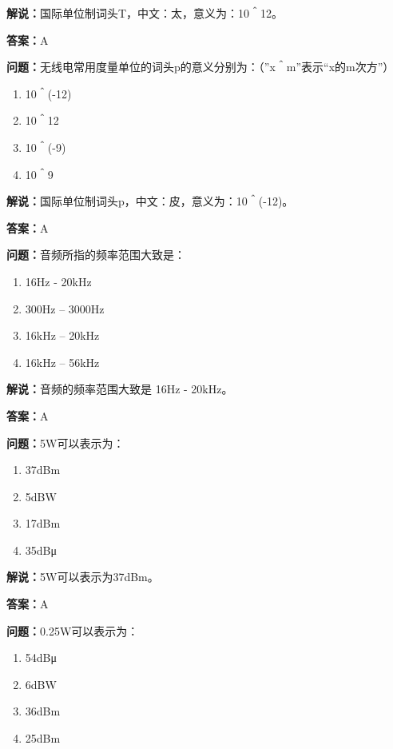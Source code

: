 \documentclass[UTF8]{ctexbook}
\begin{document}
\textbf{解说：}国际单位制词头T，中文：太，意义为：10＾12。

\textbf{答案：}A

\textbf{问题：}无线电常用度量单位的词头p的意义分别为：（”x＾m”表示“x的m次方”）

\begin{enumerate}[label=\Alph*), leftmargin=3em]
  \item 10＾(-12)
  \item 10＾12
  \item 10＾(-9)
  \item 10＾9
\end{enumerate}

\textbf{解说：}国际单位制词头p，中文：皮，意义为：10＾(-12)。

\textbf{答案：}A

\textbf{问题：}音频所指的频率范围大致是：

\begin{enumerate}[label=\Alph*), leftmargin=3em]
  \item 16Hz - 20kHz
  \item 300Hz – 3000Hz
  \item 16kHz – 20kHz
  \item 16kHz – 56kHz
\end{enumerate}

\textbf{解说：}音频的频率范围大致是 16Hz - 20kHz。%

\textbf{答案：}A

\textbf{问题：}5W可以表示为：

\begin{enumerate}[label=\Alph*), leftmargin=3em]
  \item 37dBm
  \item 5dBW
  \item 17dBm
  \item 35dBμ
\end{enumerate}

\textbf{解说：}5W可以表示为37dBm。 %

\textbf{答案：}A

\textbf{问题：}0.25W可以表示为：

\begin{enumerate}[label=\Alph*), leftmargin=3em]
  \item 54dBμ
  \item 6dBW
  \item 36dBm
  \item 25dBm
\end{enumerate}
\end{document}
